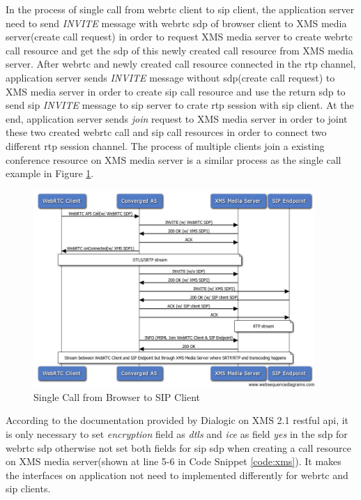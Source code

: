 \par In the process of single call from \gls{webrtc} client to \gls{sip} client, the application server need to send \textit{INVITE} message with \gls{webrtc} \gls{sdp} of browser client to XMS media server(create call request) in order to request XMS media server to create \gls{webrtc} call resource and get the \gls{sdp} of this newly created call resource from XMS media server. After \gls{webrtc} and newly created call resource connected in the \gls{rtp} channel, application server sends \textit{INVITE} message without \gls{sdp}(create call request) to XMS media server in order to create \gls{sip} call resource and use the return \gls{sdp} to send \gls{sip} \textit{INVITE} message to \gls{sip} server to crate \gls{rtp} session with \gls{sip} client. At the end, application server sends \textit{join} request to XMS media server in order to joint these two created \gls{webrtc} call and \gls{sip} call resources in order to connect two different \gls{rtp} session channel. The process of multiple clients join a existing conference resource on XMS media server is a similar process as the single call example in Figure \ref{fig:chrome2xms}.

\begin{figure}
	\centering
    	\includegraphics[width=0.95\textwidth,natwidth=610,natheight=642]{figs/chrome2xms.png}
  	\caption{Single Call from Browser to SIP Client}
  	\label{fig:chrome2xms}
\end{figure}

\par According to the documentation provided by Dialogic on XMS 2.1 \gls{rest}ful \gls{api}\cite{doc:xms_webapi}, it is only necessary to set \textit{encryption} field as \textit{dtls} and \textit{ice} as field \textit{yes} in the \gls{sdp} for \gls{webrtc} \gls{sdp} otherwise not set both fields for \gls{sip} \gls{sdp} when creating a call resource on XMS media server(shown at line 5-6 in Code Snippet \ref{code:xms}). It makes the interfaces on application not need to implemented differently for \gls{webrtc} and \gls{sip} clients.

